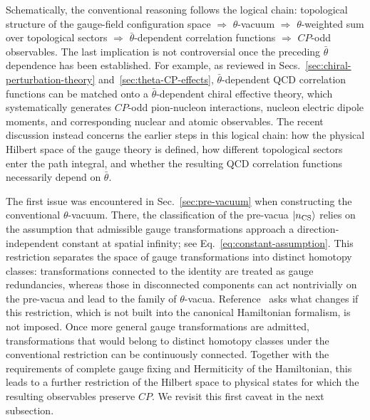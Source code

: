 \documentclass[review]{elsarticle}
\numberwithin{equation}{section}
\numberwithin{table}{section}
\numberwithin{figure}{section}
\begin{document}
Schematically, the conventional reasoning follows the logical chain: topological structure of the gauge-field configuration space $\Rightarrow$ $\theta$-vacuum $\Rightarrow$ $\theta$-weighted sum over topological sectors $\Rightarrow$ $\bar\theta$-dependent correlation functions $\Rightarrow$ $CP$-odd observables. The last implication is not controversial once the preceding $\bar\theta$ dependence has been established. For example, as reviewed in Secs.~\ref{sec:chiral-perturbation-theory} and~\ref{sec:theta-CP-effects}, $\bar\theta$-dependent QCD correlation functions can be matched onto a $\bar\theta$-dependent chiral effective theory, which systematically generates $CP$-odd pion-nucleon interactions, nucleon electric dipole moments, and corresponding nuclear and atomic observables. The recent discussion instead concerns the earlier steps in this logical chain: how the physical Hilbert space of the gauge theory is defined, how different topological sectors enter the path integral, and whether the resulting QCD correlation functions necessarily depend on $\bar\theta$.

The first issue was encountered in Sec.~\ref{sec:pre-vacuum} when constructing the conventional $\theta$-vacuum. There, the classification of the pre-vacua $|n_{\rm CS}\rangle$ relies on the assumption that admissible gauge transformations approach a direction-independent constant at spatial infinity; see Eq.~\eqref{eq:constant-assumption}. This restriction separates the space of gauge transformations into distinct homotopy classes: transformations connected to the identity are treated as gauge redundancies, whereas those in disconnected components can act nontrivially on the pre-vacua and lead to the family of $\theta$-vacua. Reference~\cite{Ai:2024vfa} asks what changes if this restriction, which is not built into the canonical Hamiltonian formalism, is not imposed. Once more general gauge transformations are admitted, transformations that would belong to distinct homotopy classes under the conventional restriction can be continuously connected. Together with the requirements of complete gauge fixing and Hermiticity of the Hamiltonian, this leads to a further restriction of the Hilbert space to physical states for which the resulting observables preserve $CP$. We revisit this first caveat in the next subsection.
\end{document}
